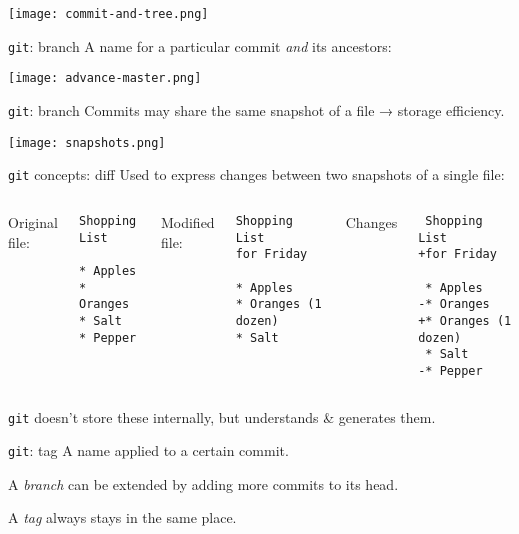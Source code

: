 \documentclass[12pt,aspectratio=169]{beamer}
\begin{document}
\begin{frame}[plain]
\centering \texttt{[image: commit-and-tree.png]}
\end{frame}

\begin{frame}{\texttt{git}: branch} \large
A name for a particular commit \emph{and} its ancestors:

\centering
\texttt{[image: advance-master.png]}
\end{frame}

\begin{frame}{\texttt{git}: branch}
Commits may share the same snapshot of a file → storage efficiency.

\texttt{[image: snapshots.png]}
\end{frame}

\begin{frame}[fragile]{\texttt{git} concepts: diff}
Used to express changes between two snapshots of a single file:

\bigskip
\begin{columns}[t]
\column{0.3\paperwidth}
Original file:

\begin{verbatim}
Shopping List

* Apples
* Oranges
* Salt
* Pepper
\end{verbatim}

\column{0.3\paperwidth}
Modified file:

\begin{verbatim}
Shopping List
for Friday

* Apples
* Oranges (1 dozen)
* Salt
\end{verbatim}

\column{0.3\paperwidth}
Changes

\begin{verbatim}
 Shopping List
+for Friday

 * Apples
-* Oranges
+* Oranges (1 dozen)
 * Salt
-* Pepper
\end{verbatim}

\end{columns}

\texttt{git} doesn't store these internally, but understands \& generates them.
\end{frame}

\begin{frame}{\texttt{git}: tag} \Large
A name applied to a certain commit.

\bigskip
A \emph{branch} can be extended by adding more commits to its head.

A \emph{tag} always stays in the same place.
\end{frame}
\end{document}
